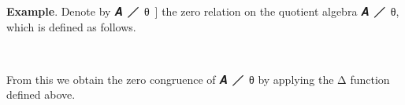 \ccpad
\textbf{Example}.
Denote by \af{𝟘[} \ab 𝑨~\af ╱~\ab θ~\af ] the zero relation on the quotient algebra \ab 𝑨~\af ╱~\ab θ, which is defined as follows.
\ccpad
\begin{code}%
\>[0][@{}l@{\AgdaIndent{1}}]%
\>[1]\AgdaSpace{}%
\AgdaSymbol{:}\AgdaSpace{}%
\AgdaSymbol{(}\AgdaSpace{}%
\AgdaSymbol{:}\AgdaSpace{}%
\AgdaSpace{}%
\AgdaSpace{}%
\AgdaSymbol{)(}\AgdaSpace{}%
\AgdaSymbol{:}\AgdaSpace{}%
\AgdaSpace{}%
\AgdaSymbol{\{}\AgdaSymbol{\}}\AgdaSpace{}%
\AgdaSymbol{)}\AgdaSpace{}%
\AgdaSpace{}%
\AgdaSpace{}%
\AgdaSymbol{(}\AgdaSpace{}%
\AgdaSpace{}%
\AgdaSpace{}%
\AgdaOperator{\AgdaFunction{/}}\AgdaSpace{}%
\AgdaSpace{}%
\AgdaSpace{}%
\AgdaSymbol{)(}\AgdaSpace{}%
\AgdaSpace{}%
\AgdaSpace{}%
\AgdaSymbol{)}\<%
\\
%
\>[1]\AgdaOperator{\AgdaFunction{𝟘[}}\AgdaSpace{}%
\AgdaSpace{}%
\AgdaSpace{}%
\AgdaSpace{}%
\AgdaOperator{\AgdaFunction{]}}\AgdaSpace{}%
\AgdaSymbol{=}\AgdaSpace{}%
\AgdaSpace{}%
\AgdaSpace{}%
\AgdaSpace{}%
\AgdaSpace{}%
\AgdaSpace{}%
\AgdaSpace{}%
\<%
\end{code}
\ccpad
From this we obtain the zero congruence of \ab 𝑨~\af ╱~\ab θ by applying the \af Δ function defined above.
\ccpad
